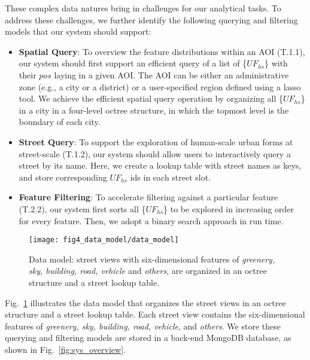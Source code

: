 These complex data natures bring in challenges for our analytical tasks.
To address these challenges, we further identify the following querying and filtering models that our system should support:

\vspace*{-2mm}
\begin{itemize}

\item
\textbf{Spatial Query}:
To overview the feature distributions within an AOI (T.1.1), our system should first support an efficient query of a list of \{$UF_{hs}$\} with their $pos$ laying in a given AOI.
The AOI can be either an administrative zone (e.g., a city or a district) or a user-specified region defined using a lasso tool.
We achieve the efficient spatial query operation by organizing all \{$UF_{hs}$\} in a city in a four-level octree structure, in which the topmost level is the boundary of each city.

\vspace*{-2mm}
\item
\textbf{Street Query}:
To support the exploration of human-scale urban forms at street-scale (T.1.2), our system should allow users to interactively query a street by its name.
Here, we create a lookup table with street names as keys, and store corresponding $UF_{hs}$ ids in each street slot.

\vspace*{-2mm}
\item
\textbf{Feature Filtering}:
To accelerate filtering against a particular feature (T.2.2), our system first sorts all \{$UF_{hs}$\} to be explored in increasing order for every feature.
Then, we adopt a binary search approach in run time.

\end{itemize}

\begin{figure}[t]
	\centering
	\texttt{[image: fig4\_data\_model/data\_model]}
	\vspace{-3mm}
	\caption{Data model: street views with six-dimensional features of \textit{greenery, sky, building, road, vehicle} and \textit{others}, are organized in an octree structure and a street lookup table.}
	\vspace{-5mm}
	\label{fig:data_model}
\end{figure}

\vspace*{-2mm}
Fig.~\ref{fig:data_model} illustrates the data model that organizes the street views in an octree structure and a street lookup table.
Each street view contains the six-dimensional features of \textit{greenery, sky, building, road, vehicle}, and \textit{others}.
We store these querying and filtering models are stored in a back-end MongoDB database, as shown in Fig.~\ref{fig:sys_overview}.
